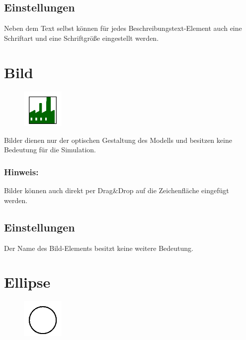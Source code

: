 \subsection*{Einstellungen}

Neben dem Text selbst können für jedes Beschreibungstext-Element auch eine Schriftart und eine Schriftgröße eingestellt werden.


\section{Bild}
\label{ref:ModelElementImage}

\begin{figure}
\vspace{-22pt}
\includegraphics[width=2cm]{imageModelElementImage.png}
\vspace{-22pt}
\end{figure}

Bilder dienen nur der optischen Gestaltung des Modells und besitzen keine Bedeutung für die Simulation.

\subsubsection*{Hinweis:}

Bilder können auch direkt per Drag\&Drop auf die Zeichenfläche eingefügt werden.

\subsection*{Einstellungen}

Der Name des Bild-Elements besitzt keine weitere Bedeutung.


\section{Ellipse}
\label{ref:ModelElementEllipse}

\begin{figure}
\vspace{-22pt}
\includegraphics[width=2cm]{imageModelElementEllipse.png}
\vspace{-22pt}
\end{figure}

